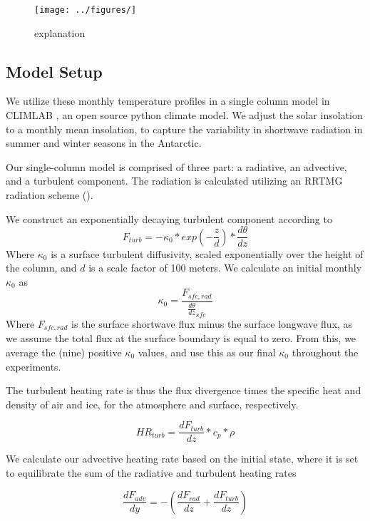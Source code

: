 \documentclass[12]{article}
\begin{document}
\begin{figure}[htb!]
\noindent\texttt{[image: ../figures/]}
\centering
\caption{explanation}
\label{label}
\end{figure}

\subsection{Model Setup}
We utilize these monthly temperature profiles in a single column model in CLIMLAB \citep{rose_climlab_2018}, an open source python climate model. We adjust the solar insolation to a monthly mean insolation, to capture the variability in shortwave radiation in summer and winter seasons in the Antarctic. 

Our single-column model is comprised of three part: a radiative, an advective, and a turbulent component. The radiation is calculated utilizing an RRTMG radiation scheme (). 

We construct an exponentially decaying turbulent component according to
\begin{equation}
    F_{turb} = -\kappa_0*exp(-\frac{z}{d})*\frac{d\theta}{dz}
\end{equation}
Where $\kappa_0$ is a surface turbulent diffusivity, scaled exponentially over the height of the column, and $d$ is a scale factor of 100 meters. We calculate an initial monthly $\kappa_0$ as
\begin{equation}
    \kappa_0 = \frac{F_{sfc, rad}}{\frac{d\theta}{dz}_{sfc}}
\end{equation}
Where $F_{sfc, rad}$ is the surface shortwave flux minus the surface longwave flux, as we assume the total flux at the surface boundary is equal to zero. From this, we average the (nine) positive $\kappa_0$ values, and use this as our final $\kappa_0$ throughout the experiments.

The turbulent heating rate is thus the flux divergence times the specific heat and density of air and ice, for the atmosphere and surface, respectively.

\begin{equation}
    HR_{turb} = \frac{dF_{turb}}{dz} * c_p * \rho
\end{equation}

We calculate our advective heating rate based on the initial state, where it is set to equilibrate the sum of the radiative and turbulent heating rates

\begin{equation}
    \frac{dF_{adv}}{dy} = -(\frac{dF_{rad}}{dz} + \frac{dF_{turb}}{dz})
\end{equation}
\end{document}
